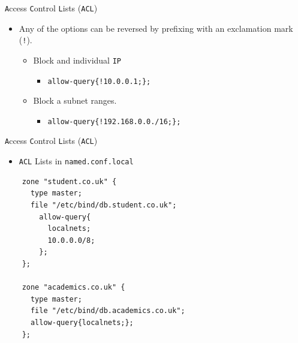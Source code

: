 \documentclass[xcolor=table]{beamer}
\begin{document}
\begin{frame}{\texttt{A}ccess \texttt{C}ontrol \texttt{L}ists (\texttt{ACL})}
  \begin{itemize}
    \item Any of the options can be reversed by prefixing with an exclamation mark (\texttt{!}).
      \begin{itemize}
        \item Block and individual \texttt{IP}
          \begin{itemize}
            \item \texttt{allow-query\{!10.0.0.1;\};}
          \end{itemize}
        \item Block a subnet ranges.
          \begin{itemize}
            \item \texttt{allow-query\{!192.168.0.0./16;\};}
          \end{itemize}
        \end{itemize}
  \end{itemize}
\end{frame}

\begin{frame}[fragile]{\texttt{A}ccess \texttt{C}ontrol \texttt{L}ists (\texttt{ACL})}
  \begin{itemize}
    \item \texttt{ACL} Lists in \texttt{named.conf.local}
  \end{itemize}
  \lstset{
    basicstyle=\small\ttfamily,
  }
  \begin{lstlisting}
    zone "student.co.uk" {
      type master;
      file "/etc/bind/db.student.co.uk";
        allow-query{
          localnets;
          10.0.0.0/8;
        };
    };
    
    zone "academics.co.uk" {
      type master;
      file "/etc/bind/db.academics.co.uk";
      allow-query{localnets;};
    };
  \end{lstlisting}
\end{frame}
\end{document}
